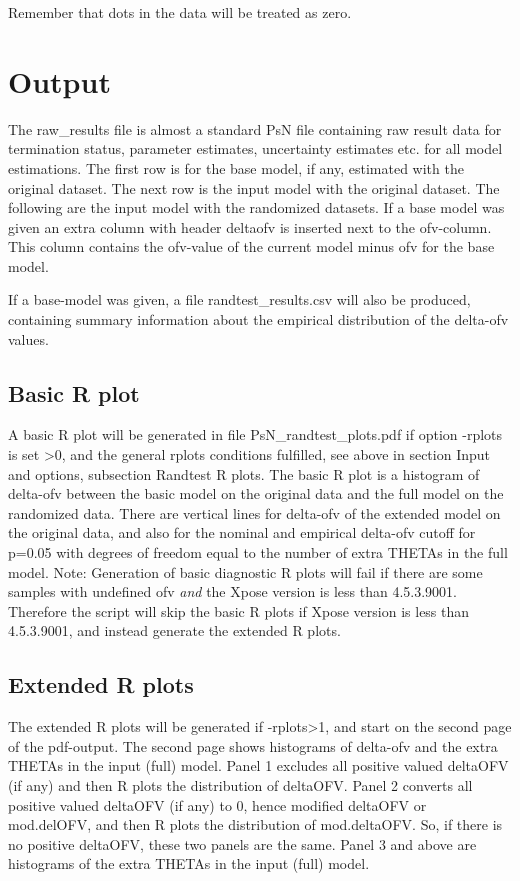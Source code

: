 \noindent Remember that dots in the data will be treated as zero.

\section{Output}
The raw\_results file is almost a standard PsN file containing raw result data for termination status, parameter estimates, uncertainty estimates etc. for all model estimations. The first row is for the base model, if any, estimated with the original dataset. The next row is the input model with the original dataset. The following are the input model with the randomized datasets. If a base model was given an extra column with header deltaofv is inserted next to the ofv-column. This column contains the ofv-value of the current model minus ofv for the base model.

If a base-model was given, a file randtest\_results.csv will also be produced, containing summary information about the empirical distribution of the delta-ofv values.

\subsection{Basic R plot}
A basic R plot will be generated in file PsN\_randtest\_plots.pdf if option -rplots is set >0,
and the general rplots conditions fulfilled, see above in section Input and options, subsection Randtest R plots.
The basic R plot is a histogram of delta-ofv between the basic model on the original data and the full model on the randomized data. There are vertical lines for delta-ofv of the extended model on the original data, and also for the nominal and empirical delta-ofv cutoff for p=0.05 with degrees of freedom equal to the number of extra THETAs in the full model.
Note: Generation of basic diagnostic R plots will fail if there are some samples with undefined ofv \emph{and} the Xpose version is less than 4.5.3.9001.
Therefore the script will skip the basic R plots if Xpose version is less than 4.5.3.9001, and instead generate the extended R plots.

\subsection{Extended R plots}
The extended R plots will be generated if -rplots>1, and start on the second page of the pdf-output. The second page shows
histograms of delta-ofv and the extra THETAs in the input (full) model. Panel 1 excludes all positive valued deltaOFV (if any) and then R plots the distribution of deltaOFV. Panel 2 converts all positive valued deltaOFV (if any) to 0, hence modified deltaOFV or mod.delOFV, and then R plots the distribution of mod.deltaOFV. So, if there is no positive deltaOFV, these two panels are the same. Panel 3 and above are histograms of the extra THETAs in the input (full) model.

